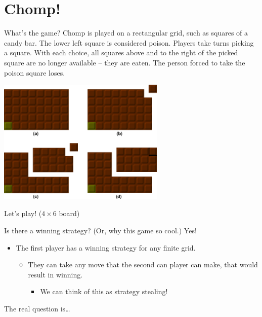 \section{Chomp!}
	\begin{namedframe}{What's the game?}
		Chomp is played on a rectangular grid, such as squares of a candy bar.
		The lower left square is considered \alert{poison}.
		Players take turns picking a square.
		With each choice, all squares above and to the right of the picked square are no longer available -- they are eaten.
		The person forced to take the \alert{poison} square loses.
		\begin{center}
			\includegraphics[width=0.6\textwidth]{Images/Chomp1}
		\end{center}
	\end{namedframe}
	\begin{namedframe}{Let's play! ($4 \times 6$ board)}
		\begin{center}
		\end{center}
	\end{namedframe}
	\begin{namedframe}{Is there a winning strategy? (Or, why this game so cool.)}
		Yes!
		\begin{itemize}[<+(1)->]
			\item The first player has a winning strategy for any finite grid.
				\begin{itemize}
					\item They can take any move that the second can player can make, that would result in winning.
					\begin{itemize}
						\item We can think of this as strategy stealing!
					\end{itemize}
				\end{itemize}
		\end{itemize}
		\pause
		The real question is\ldots
	\end{namedframe}
